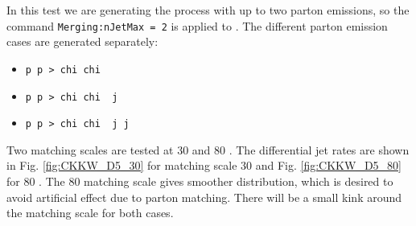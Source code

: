 In this test we are generating the process with up to two parton emissions, so the command \texttt{Merging:nJetMax = 2} is applied to \pythiaEight. The different parton emission cases are generated separately:
\begin{itemize}
\item \texttt{p p > chi chi~}
\item \texttt{p p > chi chi~ j}
\item \texttt{p p > chi chi~ j j}
\end{itemize}
Two matching scales are tested at 30 and 80 \gev. The differential jet rates are shown in Fig. \ref{fig:CKKW_D5_30} for matching scale 30 \gev and Fig. \ref{fig:CKKW_D5_80} for 80 \gev. The 80 \gev matching scale gives smoother distribution, which is desired to avoid artificial effect due to parton matching. There will be a small kink around the matching scale for both cases.

